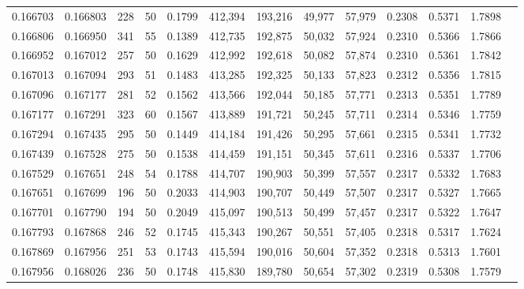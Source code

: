 \begin{tabular}{rrrrrrrrrrrrr}
0.166703 & 0.166803 &   228 &  50 &                                     0.1799 & 412,394 & 193,216 &  49,977 &  57,979 & 0.2308 & 0.5371 & 1.7898 \\
0.166806 & 0.166950 &   341 &  55 &                                     0.1389 & 412,735 & 192,875 &  50,032 &  57,924 & 0.2310 & 0.5366 & 1.7866 \\
0.166952 & 0.167012 &   257 &  50 &                                     0.1629 & 412,992 & 192,618 &  50,082 &  57,874 & 0.2310 & 0.5361 & 1.7842 \\
0.167013 & 0.167094 &   293 &  51 &                                     0.1483 & 413,285 & 192,325 &  50,133 &  57,823 & 0.2312 & 0.5356 & 1.7815 \\
0.167096 & 0.167177 &   281 &  52 &                                     0.1562 & 413,566 & 192,044 &  50,185 &  57,771 & 0.2313 & 0.5351 & 1.7789 \\
0.167177 & 0.167291 &   323 &  60 &                                     0.1567 & 413,889 & 191,721 &  50,245 &  57,711 & 0.2314 & 0.5346 & 1.7759 \\
0.167294 & 0.167435 &   295 &  50 &                                     0.1449 & 414,184 & 191,426 &  50,295 &  57,661 & 0.2315 & 0.5341 & 1.7732 \\
0.167439 & 0.167528 &   275 &  50 &                                     0.1538 & 414,459 & 191,151 &  50,345 &  57,611 & 0.2316 & 0.5337 & 1.7706 \\
0.167529 & 0.167651 &   248 &  54 &                                     0.1788 & 414,707 & 190,903 &  50,399 &  57,557 & 0.2317 & 0.5332 & 1.7683 \\
0.167651 & 0.167699 &   196 &  50 &                                     0.2033 & 414,903 & 190,707 &  50,449 &  57,507 & 0.2317 & 0.5327 & 1.7665 \\
0.167701 & 0.167790 &   194 &  50 &                                     0.2049 & 415,097 & 190,513 &  50,499 &  57,457 & 0.2317 & 0.5322 & 1.7647 \\
0.167793 & 0.167868 &   246 &  52 &                                     0.1745 & 415,343 & 190,267 &  50,551 &  57,405 & 0.2318 & 0.5317 & 1.7624 \\
0.167869 & 0.167956 &   251 &  53 &                                     0.1743 & 415,594 & 190,016 &  50,604 &  57,352 & 0.2318 & 0.5313 & 1.7601 \\
0.167956 & 0.168026 &   236 &  50 &                                     0.1748 & 415,830 & 189,780 &  50,654 &  57,302 & 0.2319 & 0.5308 & 1.7579 \\

\end{tabular}
